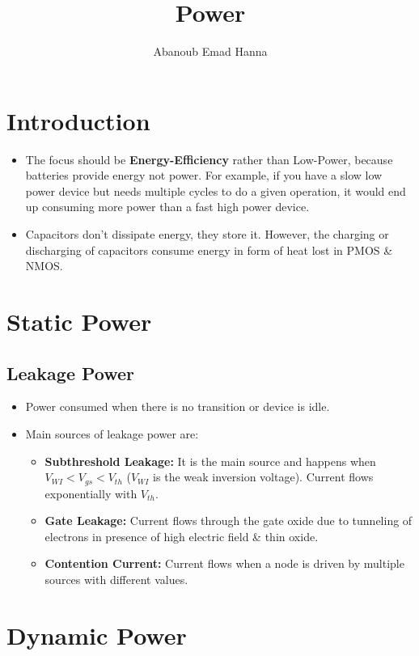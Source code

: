 \documentclass[11pt]{article}
\title{Power}
\author{Abanoub Emad Hanna}
\date{}
\begin{document}
\maketitle
\section*{Introduction}
\begin{itemize}
    \item The focus should be \textbf{Energy-Efficiency} rather than Low-Power, because batteries provide energy not power. For example, if you have a slow low power device but needs multiple cycles to do a given operation, it would end up consuming more power than a fast high power device.
    \item Capacitors don't dissipate energy, they store it. However, the charging or discharging of capacitors consume energy in form of heat lost in PMOS \& NMOS.
\end{itemize}

\section*{Static Power}
\subsection*{Leakage Power}
\begin{itemize}
    \item Power consumed when there is no transition or device is idle.
    \item Main sources of leakage power are:
        \begin{itemize}
            \item \textbf{Subthreshold Leakage:} It is the main source and happens when $V_{WI}<V_{gs}<V_{th}$ ($V_{WI}$ is the weak inversion voltage). Current flows exponentially with $V_{th}$.
            \item \textbf{Gate Leakage:} Current flows through the gate oxide due to tunneling of electrons in presence of high electric field \& thin oxide.
            \item \textbf{Contention Current:} Current flows when a node is driven by multiple sources with different values.
        \end{itemize}
\end{itemize}

\section*{Dynamic Power}
\end{document}
